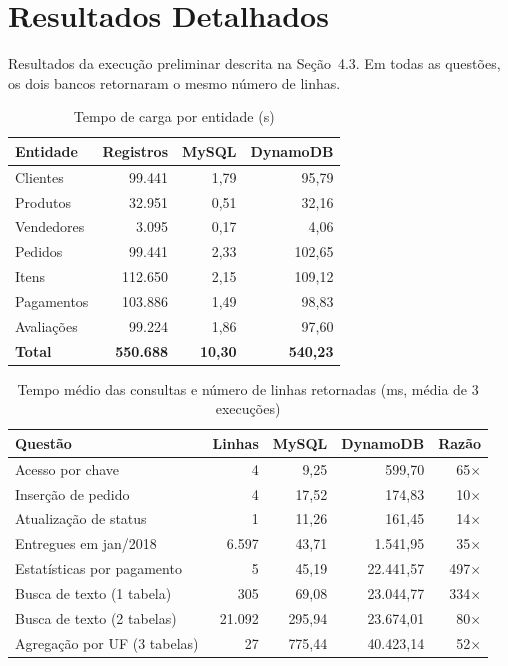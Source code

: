 \documentclass[12pt]{article}
\begin{document}
\clearpage
\section{Resultados Detalhados}
\label{anexo:resultados}

Resultados da execução preliminar descrita na Seção~4.3. Em todas as questões,
os dois bancos retornaram o mesmo número de linhas.

\begin{table}[htbp]
\centering
\caption{Tempo de carga por entidade (s)}
\label{tab:carga}
\small
\begin{tabular}{|l|r|r|r|}
\hline
\textbf{Entidade} & \textbf{Registros} & \textbf{MySQL} & \textbf{DynamoDB} \\ \hline
Clientes   & 99.441  & 1,79  & 95,79  \\ \hline
Produtos   & 32.951  & 0,51  & 32,16  \\ \hline
Vendedores & 3.095   & 0,17  & 4,06   \\ \hline
Pedidos    & 99.441  & 2,33  & 102,65 \\ \hline
Itens      & 112.650 & 2,15  & 109,12 \\ \hline
Pagamentos & 103.886 & 1,49  & 98,83  \\ \hline
Avaliações & 99.224  & 1,86  & 97,60  \\ \hline
\textbf{Total} & \textbf{550.688} & \textbf{10,30} & \textbf{540,23} \\ \hline
\end{tabular}
\end{table}

\begin{table}[htbp]
\centering
\caption{Tempo médio das consultas e número de linhas retornadas (ms, média de 3 execuções)}
\label{tab:consultas-completa}
\small
\begin{tabular}{|l|r|r|r|r|}
\hline
\textbf{Questão} & \textbf{Linhas} & \textbf{MySQL} & \textbf{DynamoDB} & \textbf{Razão} \\ \hline
Acesso por chave                  & 4      & 9,25   & 599,70    & 65$\times$  \\ \hline
Inserção de pedido                & 4      & 17,52  & 174,83    & 10$\times$  \\ \hline
Atualização de status             & 1      & 11,26  & 161,45    & 14$\times$  \\ \hline
Entregues em jan/2018             & 6.597  & 43,71  & 1.541,95  & 35$\times$  \\ \hline
Estatísticas por pagamento        & 5      & 45,19  & 22.441,57 & 497$\times$ \\ \hline
Busca de texto (1 tabela)         & 305    & 69,08  & 23.044,77 & 334$\times$ \\ \hline
Busca de texto (2 tabelas)        & 21.092 & 295,94 & 23.674,01 & 80$\times$  \\ \hline
Agregação por UF (3 tabelas)      & 27     & 775,44 & 40.423,14 & 52$\times$  \\ \hline
\end{tabular}
\end{table}
\end{document}
